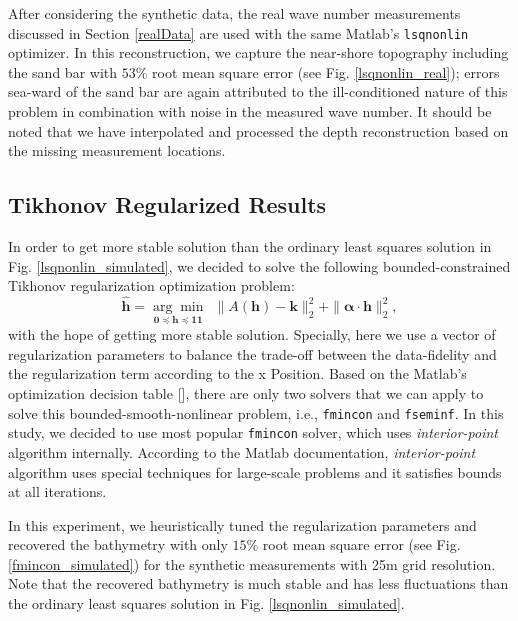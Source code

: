 After considering the synthetic data, the real wave number measurements discussed in Section \ref{realData} are used with the same Matlab's \verb|lsqnonlin| optimizer. In this reconstruction, we capture the near-shore topography including the sand bar with $53\%$ root mean square error (see Fig. \ref{lsqnonlin_real}); errors sea-ward of the sand bar are again attributed to the ill-conditioned nature of this problem in combination with noise in the measured wave number. It should be noted that we have interpolated and processed the depth reconstruction based on the missing measurement locations. 


\subsection{Tikhonov Regularized Results} \label{TickReg}

In order to get more stable solution than the ordinary least squares solution in Fig. \ref{lsqnonlin_simulated}, we decided to solve the following bounded-constrained Tikhonov regularization optimization problem:
\begin{equation}\label{LS-regBC}
\mathbf{\hat{h}} = \underset{\mathbf{0} \preceq \mathbf{h} \preceq \mathbf{11}}{\arg \min} \ \ \|  A(\mathbf{h}) -  \mathbf{k} \|_2^2  +   \| \boldsymbol{\alpha} \cdot  \mathbf{h}\|_2^2,
\end{equation}
with the hope of getting more stable solution. Specially, here we use a vector of regularization parameters to balance the trade-off between the data-fidelity and the regularization term according to the x Position. Based on the Matlab's optimization decision table [], there are only two solvers that we can apply to solve this bounded-smooth-nonlinear problem, i.e., \verb|fmincon| and \verb|fseminf|. In this study, we decided to use  most popular \verb|fmincon| solver, which uses \textit{interior-point} algorithm internally. According to the Matlab documentation, \textit{interior-point} algorithm uses special techniques for large-scale problems and it satisfies bounds at all iterations. 

In this experiment, we heuristically tuned the regularization parameters and recovered the bathymetry with only $15\%$ root mean square error (see Fig. \ref{fmincon_simulated}) for the synthetic measurements with 25m grid resolution. Note that the recovered bathymetry is much stable and has less fluctuations than the ordinary least squares solution in Fig. \ref{lsqnonlin_simulated}.   
 
